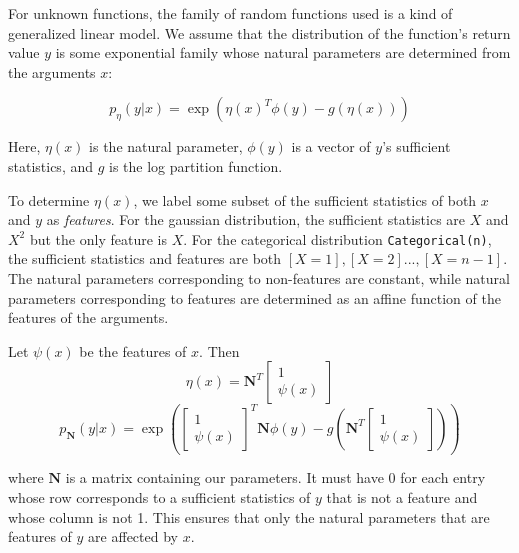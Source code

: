 \documentclass{article}
\begin{document}
    For unknown functions, the family of random functions used is a kind
    of generalized linear model.  We assume that the distribution
    of the function's return value $y$
    is some exponential family whose natural
    parameters are determined from the arguments $x$:

    $$p_{\eta}(y | x) = \exp\left(\eta(x)^T \phi(y) - g(\eta(x))\right)$$

    Here, $\eta(x)$ is the natural parameter, $\phi(y)$ is a vector of $y$'s sufficient statistics,
    and $g$ is the log partition function.

    To determine $\eta(x)$, we label
    some subset of the sufficient statistics of both $x$ and $y$ as \emph{features}.  For the gaussian
    distribution, the sufficient statistics are $X$ and $X^2$ but the only feature is $X$.  For the
    categorical distribution \texttt{Categorical(n)}, the sufficient statistics
    and features are both $[X = 1], [X = 2] ..., [X=n - 1]$.
    The natural
    parameters corresponding to non-features are constant, while natural
    parameters corresponding to features are determined as an affine
    function of the features of the arguments.

    Let $\psi(x)$ be the features of $x$.  Then
  $$\eta(x) = \mathbf{N}^T \begin{bmatrix} 1 \\ \psi(x) \end{bmatrix}$$
    $$p_{\mathbf{N}}(y | x) = \exp\left(\begin{bmatrix} 1 \\ \psi(x) \end{bmatrix} ^T \mathbf{N} \phi(y) - g\left(\mathbf{N}^T \begin{bmatrix} 1 \\ \psi(x) \end{bmatrix}\right)\right)$$

    where $\mathbf{N}$ is a matrix containing our parameters.  It must have 0 for each entry whose row corresponds
    to a sufficient statistics of $y$ that is not a feature and whose column is not 1.
    This ensures that only the
    natural parameters that are features of $y$ are affected by $x$.
\end{document}
